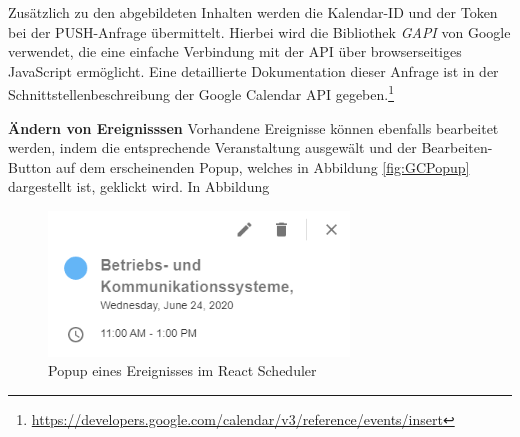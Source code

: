 Zusätzlich zu den abgebildeten Inhalten werden die Kalendar-ID und der Token bei der PUSH-Anfrage übermittelt. Hierbei wird die Bibliothek \textit{GAPI} von Google verwendet, die eine einfache Verbindung mit der \ac{API} über browserseitiges JavaScript ermöglicht. 
Eine detaillierte Dokumentation dieser Anfrage ist in der Schnittstellenbeschreibung der Google Calendar \ac{API} gegeben.\footnote{\url{https://developers.google.com/calendar/v3/reference/events/insert}}

%
%

\textbf{Ändern von Ereignisssen}\newline
Vorhandene Ereignisse können ebenfalls bearbeitet werden, indem die entsprechende Veranstaltung ausgewält und der Bearbeiten-Button auf dem erscheinenden Popup, welches in Abbildung \vref{fig:GCPopup} dargestellt ist, geklickt wird. 
In Abbildung 
\begin{figure}[H]
	\centering 
	\includegraphics[width=8cm]{img/FrontEnd/GCPopup.png}
	\caption[Popup eines Ereignisses im React Scheduler]{\label{fig:GCPopup}Popup eines Ereignisses im React Scheduler\footnotemark}
\end{figure}

